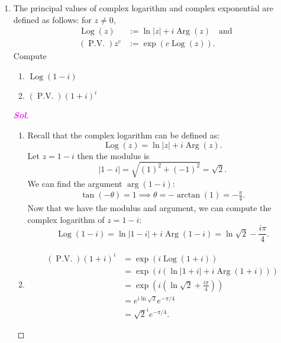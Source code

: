 \documentclass{article}
\theoremstyle{definition}
\newcommand{\Log}{\operatorname{Log}}
\newcommand{\Arg}{\operatorname{Arg}}
\newcommand{\pv}{\operatorname{P.V.}}
\newcommand{\of}[1]{\left( #1 \right)}
\newcommand{\abs}[1]{\left\lvert #1 \right\rvert}
\newcommand{\sol}{\textcolor{magenta}{\bf Sol}}
\begin{document}
\begin{enumerate}
	\item The principal values of complex logarithm and complex exponential are defined as follows: for $z\neq 0$,
	\begin{align*}
		\Log\of{z} &:=\ln\abs{z}+i\Arg\of{z}\quad\text{and}\\
		\of{\pv}z^c &:=\exp\of{c\Log\of{z}}.
	\end{align*} Compute \begin{enumerate}
		\item $\Log\of{1-i}$ 
		\item $\of{\pv}\of{1+i}^i$
	\end{enumerate}
	\begin{proof}[\sol]
		\begin{enumerate}
			\item Recall that the complex logarithm can be defined as:
			\[\Log(z) = \ln|z| + i\Arg(z).
			\]
			Let $z = 1-i$ then the modulus is
			\[|1-i| = \sqrt{(1)^2 + (-1)^2} = \sqrt{2}.\]
			We can find the argument $\arg(1-i)$: \begin{align*}
				\tan(-\theta)=1\implies\theta=-\arctan\of{1}=-\frac{\pi}{4}.
			\end{align*}
			Now that we have the modulus and argument, we can compute the complex logarithm of $z = 1 - i$:
			\[
			\Log(1-i) = \ln|1-i| + i\Arg(1-i) = \ln\sqrt{2} - \frac{i\pi}{4}.
			\]
			
			\item \begin{align*}
				\of{\pv}\of{1+i}^i &=\exp\of{i\Log\of{1+i}}\\
				&=\exp\of{i\of{\ln\abs{1+i}+i\Arg\of{1+i}}}\\
				&=\exp\of{i\of{\ln\sqrt{2}+\frac{i\pi}{4}}}\\
				&=e^{i\ln\sqrt{2}}e^{-\pi/4}\\
				&=\sqrt{2}^ie^{-\pi/4}.
			\end{align*}
		\end{enumerate}
	\end{proof}


\end{enumerate}
\end{document}
